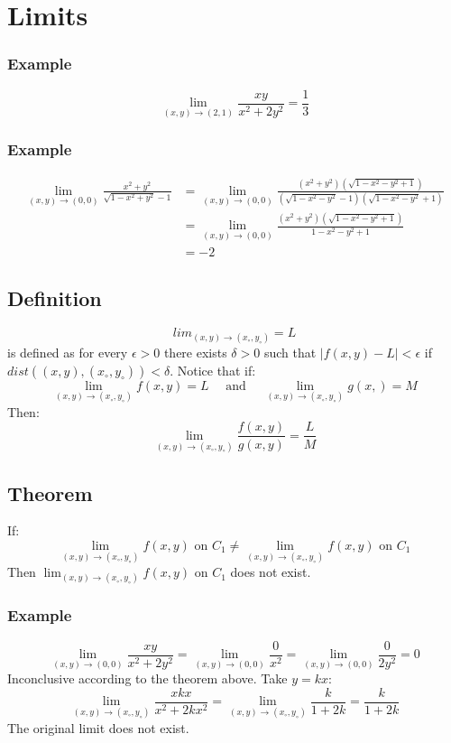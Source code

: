 \documentclass[letterpaper, 12pt]{math}
\begin{document}
\section*{Limits}

\subsubsection*{Example}
\[ \lim_{(x,y)\to(2,1)}\frac{xy}{x^2+2y^2} = \frac{1}{3} \]

\subsubsection*{Example}
\begin{align*}
  \lim_{(x,y)\to(0,0)}\frac{x^2+y^2}{\sqrt{1-x^2+y^2}-1} &=
    \lim_{(x,y)\to(0,0)}\frac{(x^2+y^2)(\sqrt{1-x^2-y^2+1})}
    {(\sqrt{1-x^2-y^2}-1)(\sqrt{1-x^2-y^2}+1)} \\
  &= \lim_{(x,y)\to(0,0)}\frac{(x^2+y^2)(\sqrt{1-x^2-y^2+1})}
    {1-x^2-y^2+1} \\
  &= -2
\end{align*}

\subsection*{Definition}
\[ lim_{(x,y)\to(x_{\circ},y_{\circ})} = L \]
is defined as for every \( \epsilon > 0 \) there exists \( \delta > 0 \) such
that \( |f(x,y)-L| < \epsilon \) if \( dist((x,y),(x_{\circ},y_{\circ}))
< \delta \). Notice that if:
\[ \lim_{(x,y)\to(x_{\circ},y_{\circ})}f(x,y) = L \quad\text{ and }\quad
  \lim_{(x,y)\to(x_{\circ},y_{\circ})}g(x,) = M \]
Then:
\[ \lim_{(x,y)\to(x_{\circ},y_{\circ})}\frac{f(x,y)}{g(x,y)} = \frac{L}{M} \]

\subsection*{Theorem}
If:
\[ \lim_{(x,y)\to(x_{\circ},y_{\circ})}f(x,y)\text{ on }C_1 \ne
  \lim_{(x,y)\to(x_{\circ},y_{\circ})}f(x,y)\text{ on }C_1 \]
Then \( \lim_{(x,y)\to(x_{\circ},y_{\circ})}f(x,y)\text{ on }C_1 \) does not
exist.

\subsubsection*{Example}
\[ \lim_{(x,y)\to(0,0)}\frac{xy}{x^2+2y^2} = \lim_{(x,y)\to(0,0)}\frac{0}{x^2} =
  \lim_{(x,y)\to(0,0)}\frac{0}{2y^2} = 0 \]
Inconclusive according to the theorem above. Take \( y = kx \):
\[ \lim_{(x,y)\to(x_{\circ},y_{\circ})}\frac{xkx}{x^2+2kx^2} =
  \lim_{(x,y)\to(x_{\circ},y_{\circ})}\frac{k}{1+2k} = \frac{k}{1+2k} \]
The original limit does not exist.
\end{document}
